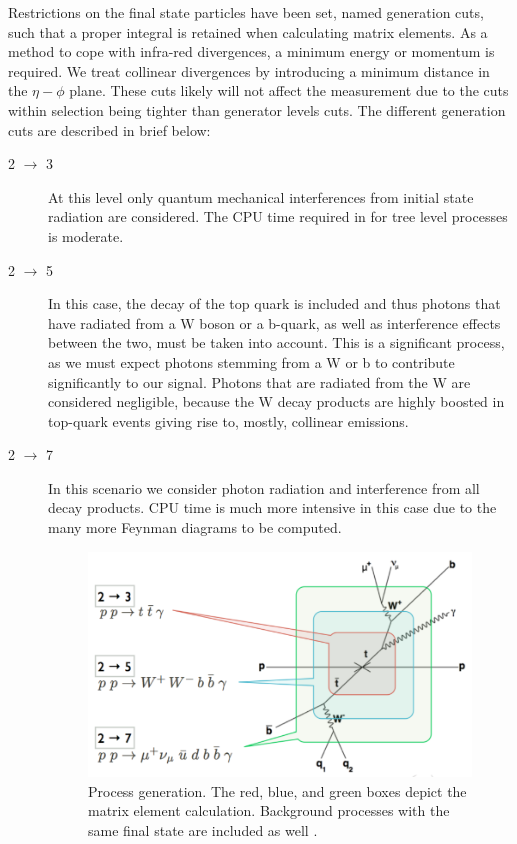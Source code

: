 Restrictions on the final state particles have been set, named generation cuts, such that a proper integral is retained when calculating matrix elements. As a method to cope with infra-red divergences, a minimum energy or momentum is required. We treat collinear divergences by introducing a minimum distance in the $\eta - \phi$ plane. These cuts likely will not affect the measurement due to the cuts within selection being tighter than generator levels cuts. The different generation cuts are described in brief below:

\begin{description}
\item[2 $\to$ 3] At this level only quantum mechanical interferences from initial state radiation are considered. The CPU time required in for tree level processes is moderate.

\item[2 $\to$ 5] In this case, the decay of the top quark is included and thus photons that have radiated from a W boson or a b-quark, as well as interference effects between the two, must be taken into account. This is a significant process, as we must expect photons stemming from a W or b to contribute significantly to our signal. Photons that are radiated from the W are considered negligible, because the W decay products are highly boosted in top-quark events giving rise to, mostly, collinear emissions. 

\item[2 $\to$ 7] In this scenario we consider photon radiation and interference from all decay products. CPU time is much more intensive in this case due to the many more Feynman diagrams to be computed.                                                                            

\begin{figure}\label{fig-MatrixElementCalculation}
\begin{center}
\includegraphics[width=\textwidth]{Figures/MatrixElementCalculation.png}
\caption{Process generation. The red, blue, and green boxes depict the matrix element calculation. Background processes with the same final state are included as well \cite{heinerthesis}.}
\end{center}
\end{figure}
                               

\end{description}

